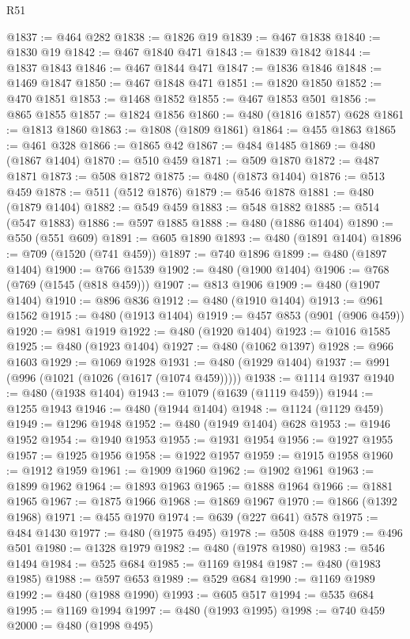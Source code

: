 \begin{lexlean}{R51}
\begin{coremodule}
@1837 := @464 @282
@1838 := @1826 @19
@1839 := @467 @1838
@1840 := @1830 @19
@1842 := @467 @1840 @471
@1843 := @1839 @1842
@1844 := @1837 @1843
@1846 := @467 @1844 @471
@1847 := @1836 @1846
@1848 := @1469 @1847
@1850 := @467 @1848 @471
@1851 := @1820 @1850
@1852 := @470 @1851
@1853 := @1468 @1852
@1855 := @467 @1853 @501
@1856 := @865 @1855
@1857 := @1824 @1856
@1860 := @480 (@1816 @1857) @628
@1861 := @1813 @1860
@1863 := @1808 (@1809 @1861)
@1864 := @455 @1863
@1865 := @461 @328
@1866 := @1865 @42
@1867 := @484 @1485
@1869 := @480 (@1867 @1404)
@1870 := @510 @459
@1871 := @509 @1870
@1872 := @487 @1871
@1873 := @508 @1872
@1875 := @480 (@1873 @1404)
@1876 := @513 @459
@1878 := @511 (@512 @1876)
@1879 := @546 @1878
@1881 := @480 (@1879 @1404)
@1882 := @549 @459
@1883 := @548 @1882
@1885 := @514 (@547 @1883)
@1886 := @597 @1885
@1888 := @480 (@1886 @1404)
@1890 := @550 (@551 @609)
@1891 := @605 @1890
@1893 := @480 (@1891 @1404)
@1896 := @709 (@1520 (@741 @459))
@1897 := @740 @1896
@1899 := @480 (@1897 @1404)
@1900 := @766 @1539
@1902 := @480 (@1900 @1404)
@1906 := @768 (@769 (@1545 (@818 @459)))
@1907 := @813 @1906
@1909 := @480 (@1907 @1404)
@1910 := @896 @836
@1912 := @480 (@1910 @1404)
@1913 := @961 @1562
@1915 := @480 (@1913 @1404)
@1919 := @457 @853 (@901 (@906 @459))
@1920 := @981 @1919
@1922 := @480 (@1920 @1404)
@1923 := @1016 @1585
@1925 := @480 (@1923 @1404)
@1927 := @480 (@1062 @1397)
@1928 := @966 @1603
@1929 := @1069 @1928
@1931 := @480 (@1929 @1404)
@1937 := @991 (@996 (@1021 (@1026 (@1617 (@1074 @459)))))
@1938 := @1114 @1937
@1940 := @480 (@1938 @1404)
@1943 := @1079 (@1639 (@1119 @459))
@1944 := @1255 @1943
@1946 := @480 (@1944 @1404)
@1948 := @1124 (@1129 @459)
@1949 := @1296 @1948
@1952 := @480 (@1949 @1404) @628
@1953 := @1946 @1952
@1954 := @1940 @1953
@1955 := @1931 @1954
@1956 := @1927 @1955
@1957 := @1925 @1956
@1958 := @1922 @1957
@1959 := @1915 @1958
@1960 := @1912 @1959
@1961 := @1909 @1960
@1962 := @1902 @1961
@1963 := @1899 @1962
@1964 := @1893 @1963
@1965 := @1888 @1964
@1966 := @1881 @1965
@1967 := @1875 @1966
@1968 := @1869 @1967
@1970 := @1866 (@1392 @1968)
@1971 := @455 @1970
@1974 := @639 (@227 @641) @578
@1975 := @484 @1430
@1977 := @480 (@1975 @495)
@1978 := @508 @488
@1979 := @496 @501
@1980 := @1328 @1979
@1982 := @480 (@1978 @1980)
@1983 := @546 @1494
@1984 := @525 @684
@1985 := @1169 @1984
@1987 := @480 (@1983 @1985)
@1988 := @597 @653
@1989 := @529 @684
@1990 := @1169 @1989
@1992 := @480 (@1988 @1990)
@1993 := @605 @517
@1994 := @535 @684
@1995 := @1169 @1994
@1997 := @480 (@1993 @1995)
@1998 := @740 @459
@2000 := @480 (@1998 @495)

\end{coremodule}
\end{lexlean}

